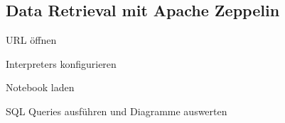 \subsection{Data Retrieval mit Apache Zeppelin}
URL öffnen

Interpreters konfigurieren

Notebook laden

SQL Queries ausführen und Diagramme auswerten
